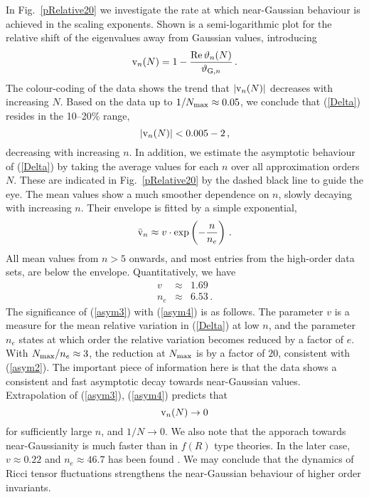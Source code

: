 \documentclass[notitlepage,eqsecnum,bm,amsmath,preprintnumbers,superscriptaddress,nofootinbib,aps,11pt]{revtex4-1}
\def\eq#1{(\ref{#1})}
\def\beq{\begin{equation}}
\def\eeq{\end{equation}}
\begin{document}
In Fig.~\ref{pRelative20} we investigate the rate at which near-Gaussian behaviour is achieved in the scaling exponents. Shown is a semi-logarithmic plot for  the relative shift of the eigenvalues away from Gaussian values, introducing
\begin{equation}\label{Delta}
{\rm v}_n(N)=1-\frac{{\rm Re}\,\vartheta_n(N)}{\vartheta_{{\rm G},n}}\,.
\end{equation}
The colour-coding of the data shows the trend that $|{\rm v}_n(N)|$ decreases with increasing $N$. 
Based on the data up to $1/N_{\rm max}\approx 0.05$,
we conclude that \eq{Delta} resides in the  10--20\% range, 
\beq\label{asym2}
|{\rm v}_n(N)|<0.005-2\,,
\eeq 
decreasing with increasing $n$. In addition, we estimate the asymptotic behaviour of \eq{Delta} by taking the average values  for each $n$ over all approximation orders $N$. These are indicated in Fig.~\ref{pRelative20} by the dashed black line to guide the eye. The mean values  show a much smoother dependence on $n$, slowly decaying with increasing $n$. Their envelope is  fitted  by a simple exponential, 
\beq\label{asym3}
{\bar {\rm v}_n}\approx v\cdot \exp\left(-\frac{n}{n_e}\right)\,.
\eeq 
All mean values from $n>5$ onwards, and most entries from the high-order data sets, are below the envelope. Quantitatively, we have
\beq\label{asym4}
\begin{array}{rcl}
v&\approx&1.69
\\[.5ex]
n_e&\approx&6.53\,.
\end{array}
\eeq 
The significance of  \eq{asym3} with \eq{asym4} is as follows. The parameter $v$ is a measure for the mean relative variation in \eq{Delta} at low $n$, and the parameter $n_e$ states at which order the relative variation becomes reduced by a factor of $e$. With $N_{\rm max}/n_e\approx 3$, the reduction at $N_{\rm max}$ is by a factor of $20$, consistent with \eq{asym2}.
The important piece of information here is that the data shows a consistent and fast asymptotic decay towards near-Gaussian values. Extrapolation of \eq{asym3}, \eq{asym4}  predicts that 
\begin{equation}\label{vto0}
{\rm v}_n(N)\to 0
\end{equation}
for sufficiently large $n$, and
$1/N\to 0$.
We also note that the apporach towards near-Gaussianity is much faster than in $f(R)$ type theories. In the later case, $v\approx 0.22$ and $n_e\approx 46.7$ has been found \cite{Falls:2014tra}. We may conclude that the dynamics of Ricci tensor fluctuations strengthens the near-Gaussian behaviour of higher order invariants.
\end{document}

